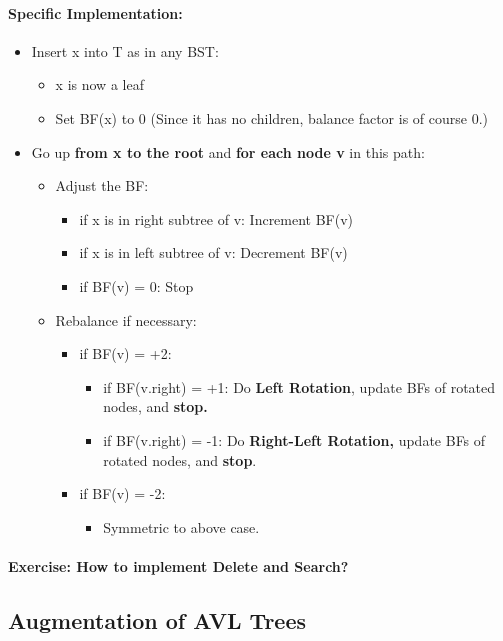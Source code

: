 \documentclass{article}
\begin{document}
\paragraph{Specific Implementation: }
\begin{itemize}
\item Insert x into T as in any BST:
\begin{itemize}
\item x is now a leaf
\item Set BF(x) to 0 (Since it has no children, balance factor is of course 0.)
\end{itemize}
\item Go up \textbf{from x to the root} and \textbf{for each node v} in this path: 
\begin{itemize}
\item Adjust the BF:
\begin{itemize}b
\item 
if x is in right subtree of v: Increment BF(v)
\item
if x is in left subtree of v: Decrement BF(v)
\item if BF(v) = 0: Stop
\end{itemize}
\item Rebalance if necessary:
\begin{itemize}
\item 
if BF(v) = +2:
\begin{itemize}
\item 
if BF(v.right) = +1: Do \textbf{Left Rotation}, update BFs of rotated nodes, and \textbf{stop.}
\item 
if BF(v.right) = -1: Do \textbf{Right-Left Rotation, }update BFs of rotated nodes, and \textbf{stop}.
\end{itemize}
\item if BF(v) = -2:
\begin{itemize}
\item 
Symmetric to above case.
\end{itemize}
\end{itemize}
\end{itemize}
\end{itemize}
\paragraph{Exercise: How to implement Delete and Search?}
\subsection{Augmentation of AVL Trees}
\end{document}
